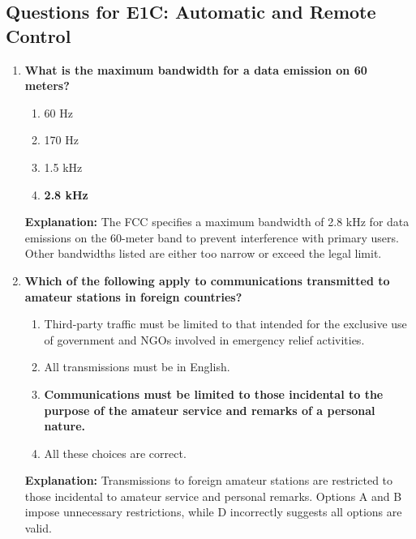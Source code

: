 \subsection*{Questions for E1C: Automatic and Remote Control}

\begin{enumerate}
    \item \textbf{What is the maximum bandwidth for a data emission on 60 meters?}
    \begin{enumerate}
        \item 60 Hz\\
        \item 170 Hz\\
        \item 1.5 kHz\\
        \item \textbf{2.8 kHz}
    \end{enumerate}
    \textbf{Explanation:} The FCC specifies a maximum bandwidth of 2.8 kHz for data emissions on the 60-meter band to prevent interference with primary users. Other bandwidths listed are either too narrow or exceed the legal limit.

    \item \textbf{Which of the following apply to communications transmitted to amateur stations in foreign countries?}
    \begin{enumerate}
        \item Third-party traffic must be limited to that intended for the exclusive use of government and NGOs involved in emergency relief activities.\\
        \item All transmissions must be in English.\\
        \item \textbf{Communications must be limited to those incidental to the purpose of the amateur service and remarks of a personal nature.}\\
        \item All these choices are correct.
    \end{enumerate}
    \textbf{Explanation:} Transmissions to foreign amateur stations are restricted to those incidental to amateur service and personal remarks. Options A and B impose unnecessary restrictions, while D incorrectly suggests all options are valid.


\end{enumerate}
